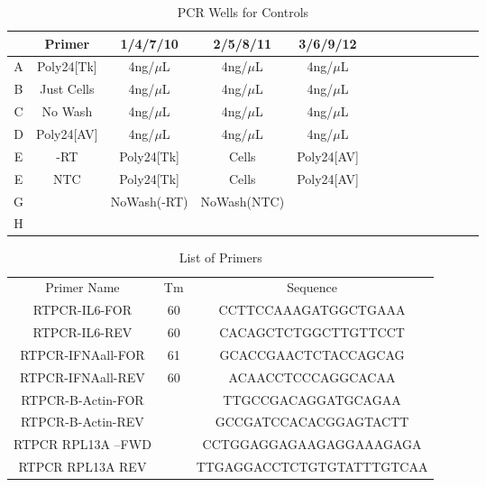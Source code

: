 \documentclass[journal, a4paper]{IEEEtran}
\begin{document}
  \begin{table}[!hbt]
    \begin{center}
    \caption{PCR Wells for Controls}
    \label{tab:simParameters}
    \begin{tabular}{|c|c|c|c|c|c|c|c|c|c|c|c|c|c|}
      \hline
      & Primer & 1/4/7/10 & 2/5/8/11 & 3/6/9/12 \\
      \hline
      A & Poly24[Tk] & 4ng/$\mu$L & 4ng/$\mu$L & 4ng/$\mu$L\\
      \hline
      B & Just Cells & 4ng/$\mu$L & 4ng/$\mu$L & 4ng/$\mu$L\\
      \hline
      C & No Wash & 4ng/$\mu$L & 4ng/$\mu$L & 4ng/$\mu$L\\
      \hline
      D & Poly24[AV] & 4ng/$\mu$L & 4ng/$\mu$L & 4ng/$\mu$L\\
      \hline
      E & -RT & Poly24[Tk] & Cells & Poly24[AV] \\
      \hline
      E & NTC & Poly24[Tk] & Cells & Poly24[AV] \\
      \hline
      G & & NoWash(-RT) & NoWash(NTC) &\\
      \hline
      H & & & &\\
      \hline
    \end{tabular}
    \end{center}
  \end{table}

  \begin{table}[!hbt]
    \begin{center}
    \caption{List of Primers}
    \label{tab:simParameters}
    \begin{tabular}{|c|c|c|}
      \hline
      Primer Name & Tm & Sequence \\
      RTPCR-IL6-FOR & 60 & CCTTCCAAAGATGGCTGAAA \\
      \hline
      RTPCR-IL6-REV & 60 & CACAGCTCTGGCTTGTTCCT \\
      \hline
      RTPCR-IFNAall-FOR & 61 & GCACCGAACTCTACCAGCAG \\
      \hline
      RTPCR-IFNAall-REV & 60 & ACAACCTCCCAGGCACAA \\
      \hline
      RTPCR-B-Actin-FOR & & TTGCCGACAGGATGCAGAA \\
      \hline
      RTPCR-B-Actin-REV & & GCCGATCCACACGGAGTACTT \\
      \hline
      RTPCR RPL13A –FWD & & CCTGGAGGAGAAGAGGAAAGAGA \\
      \hline
      RTPCR RPL13A REV & & TTGAGGACCTCTGTGTATTTGTCAA \\
      \hline
    \end{tabular}
    \end{center}
  \end{table}
\end{document}
